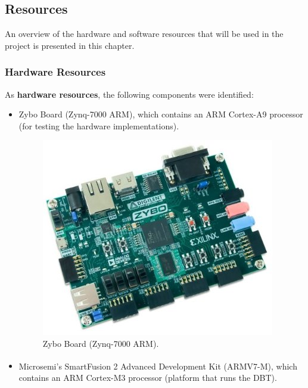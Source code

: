 \documentclass[12pt]{article}
\begin{document}
{\subsection{Resources}

An overview of the hardware and software resources that will be used in the project  is presented in this chapter. 

\subsubsection{Hardware Resources}

As \textbf{hardware resources}, the following components were identified:
\begin{itemize}
\item Zybo Board (Zynq-7000 ARM), which contains an ARM Cortex-A9 processor (for testing the hardware implementations).

\begin{figure}[!htb]
\centering
\includegraphics[scale=0.3]{images/Zybo.jpg}
\caption{Zybo Board (Zynq-7000 ARM).}
\label{fig:Zybo} 
\end{figure}

\item Microsemi's SmartFusion\textsuperscript{\textregistered} 2 Advanced Development Kit (ARMV7-M), which contains an ARM Cortex-M3 processor (platform that runs the DBT).
\end{itemize}

}
\end{document}
